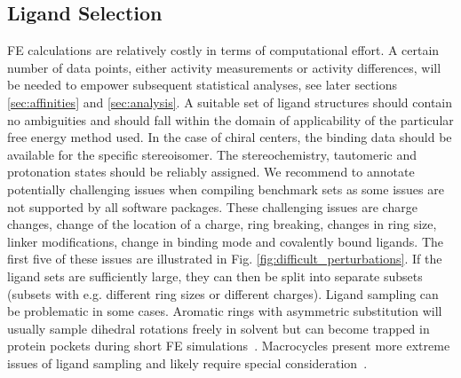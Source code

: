 \documentclass[9pt,bestpractices]{livecoms}
\begin{document}
\subsection{Ligand Selection}
\label{sec:dataset:ligands}
FE calculations are relatively costly in terms of computational effort. A certain number of data points, either activity measurements or activity differences, will be needed to empower subsequent statistical analyses, see later sections \ref{sec:affinities} and \ref{sec:analysis}. 
A suitable set of ligand structures should contain no ambiguities and should fall within the domain of applicability
of the particular free energy method used. 
In the case of chiral centers, the binding data should be available for the specific stereoisomer.
The stereochemistry, tautomeric and protonation states should be reliably assigned. 
%
We recommend to annotate potentially challenging issues when compiling benchmark sets as some issues are not supported by all
software packages. 
These challenging issues are 
charge changes, 
change of the location of a charge,
ring breaking,
changes in ring size, 
linker modifications,
change in binding mode and 
covalently bound ligands. 
The first five of these issues are illustrated in Fig. \ref{fig:difficult_perturbations}.
%
If the ligand sets are sufficiently large, they can then be split into separate subsets (subsets with e.g. different ring sizes or different charges).
%
Ligand sampling can be problematic in some cases. Aromatic rings with asymmetric substitution will usually sample dihedral rotations freely in solvent but can become trapped in protein pockets during short FE simulations~\cite{kaus_how_2015,sasmal_sampling_2020}. Macrocycles present more extreme issues of ligand sampling and likely require special consideration~\cite{wagner_computational_2017,yu_accurate_2017,paulsen_evaluation_2020}. 
\end{document}
